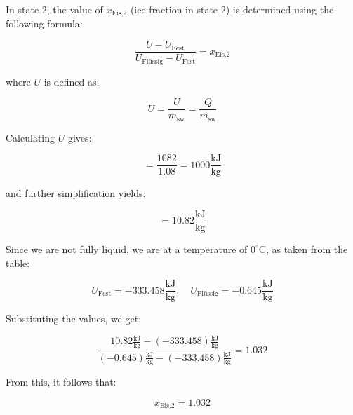 In state 2, the value of \( x_{\text{Eis,2}} \) (ice fraction in state 2) is determined using the following formula:

\[
\frac{U - U_{\text{Fest}}}{U_{\text{Flüssig}} - U_{\text{Fest}}} = x_{\text{Eis,2}}
\]

where \( U \) is defined as:

\[
U = \frac{U}{m_{\text{sw}}} = \frac{Q}{m_{\text{sw}}}
\]

Calculating \( U \) gives:

\[
= \frac{1082}{1.08} = 1000 \frac{\text{kJ}}{\text{kg}}
\]

and further simplification yields:

\[
= 10.82 \frac{\text{kJ}}{\text{kg}}
\]

Since we are not fully liquid, we are at a temperature of \(0^\circ\)C, as taken from the table:

\[
U_{\text{Fest}} = -333.458 \frac{\text{kJ}}{\text{kg}}, \quad U_{\text{Flüssig}} = -0.645 \frac{\text{kJ}}{\text{kg}}
\]

Substituting the values, we get:

\[
\frac{10.82 \frac{\text{kJ}}{\text{kg}} - (-333.458) \frac{\text{kJ}}{\text{kg}}}{(-0.645) \frac{\text{kJ}}{\text{kg}} - (-333.458) \frac{\text{kJ}}{\text{kg}}} = 1.032
\]

From this, it follows that:

\[
x_{\text{Eis,2}} = 1.032
\]